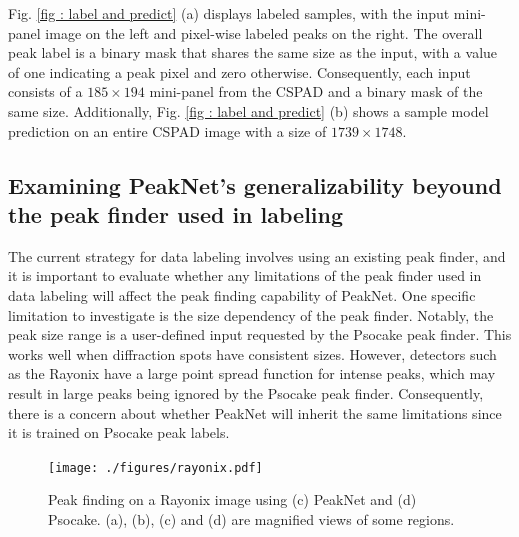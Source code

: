 \documentclass[conference]{IEEEtran}
\newcommand{\peaknet}{PeakNet}
\newcommand{\psocake}{Psocake}
\begin{document}
Fig. \ref{fig : label and predict} (a) displays labeled samples, with the input
mini-panel image on the left and pixel-wise labeled peaks on the right.  The
overall peak label is a binary mask that shares the same size as the input, with
a value of one indicating a peak pixel and zero otherwise.  Consequently, each
input consists of a $185 \times 194$ mini-panel from the CSPAD and a binary mask
of the same size.  Additionally, Fig.  \ref{fig : label and predict} (b) shows a
sample model prediction on an entire CSPAD image with a size of $1739 \times
1748$.  


\subsection{Examining \peaknet{}'s generalizability beyound the peak finder used
in labeling}

The current strategy for data labeling involves using an existing peak finder,
and it is important to evaluate whether any limitations of the peak finder used
in data labeling will affect the peak finding capability of \peaknet{}. One
specific limitation to investigate is the size dependency of the peak finder.
Notably, the peak size range is a user-defined input requested by the \psocake{}
peak finder. This works well when diffraction spots have consistent sizes.
However, detectors such as the Rayonix have a large point spread function for
intense peaks, which may result in large peaks being ignored by the \psocake{}
peak finder.  Consequently, there is a concern about whether \peaknet{} will
inherit the same limitations since it is trained on \psocake{} peak labels.

\begin{figure}[htbp]
\centering
\texttt{[image: ./figures/rayonix.pdf]}
\caption{Peak finding on a Rayonix image using (c) \peaknet{} and (d) \psocake{}.  (a), (b), (c) and (d) are magnified views of some regions.}
\label{fig : rayonix}
\end{figure}
\end{document}
